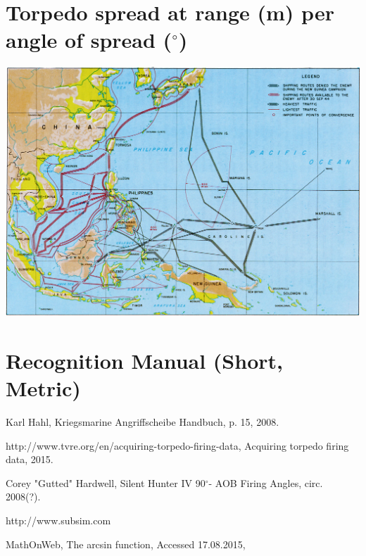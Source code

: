 \documentclass{article}
\newcommand{\degree}{$^{\circ}$}
\begin{document}
\pagebreak

\section{Torpedo spread at range (m) per angle of spread (\degree)}




\pagebreak

\includegraphics[angle=270]{cmap}

\section{Recognition Manual (Short, Metric)}


\pagebreak
\begin{thebibliography}{9}

  Karl Hahl,
  Kriegsmarine Angriffscheibe Handbuch,
  p. 15,
  2008.
  
http://www.tvre.org/en/acquiring-torpedo-firing-data,
Acquiring torpedo firing data,
2015.

Corey "Gutted" Hardwell,
Silent Hunter IV 90\degree - AOB Firing Angles,
circ. 2008(?).

http://www.subsim.com

MathOnWeb,
The arcsin function,
Accessed 17.08.2015,


\end{thebibliography}
\end{document}
